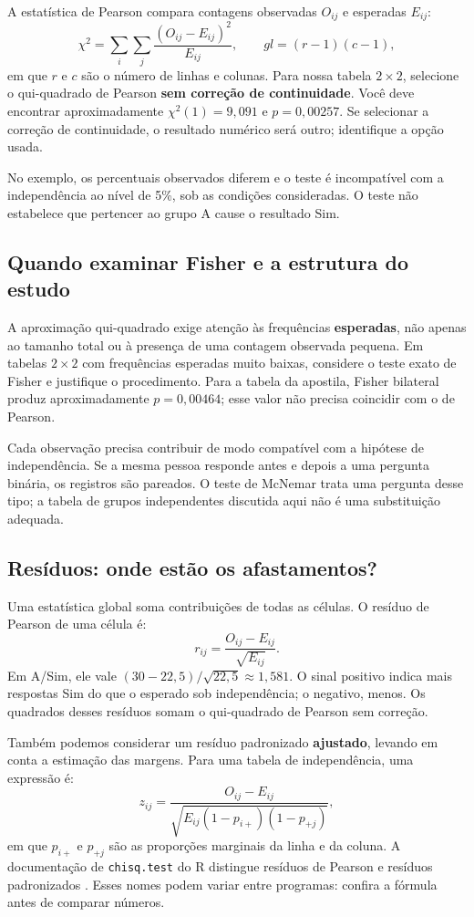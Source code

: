 A estatística de Pearson compara contagens observadas $O_{ij}$ e esperadas $E_{ij}$:
\[
\chi^2=\sum_i\sum_j\frac{(O_{ij}-E_{ij})^2}{E_{ij}},
\qquad gl=(r-1)(c-1),
\]
em que $r$ e $c$ são o número de linhas e colunas. Para nossa tabela $2\times2$, selecione o qui-quadrado de Pearson \textbf{sem correção de continuidade}. Você deve encontrar aproximadamente $\chi^2(1)=9{,}091$ e $p=0{,}00257$. Se selecionar a correção de continuidade, o resultado numérico será outro; identifique a opção usada.

No exemplo, os percentuais observados diferem e o teste é incompatível com a independência ao nível de 5\%, sob as condições consideradas. O teste não estabelece que pertencer ao grupo A cause o resultado Sim.

\subsection{Quando examinar Fisher e a estrutura do estudo}

A aproximação qui-quadrado exige atenção às frequências \textbf{esperadas}, não apenas ao tamanho total ou à presença de uma contagem observada pequena. Em tabelas $2\times2$ com frequências esperadas muito baixas, considere o teste exato de Fisher e justifique o procedimento. Para a tabela da apostila, Fisher bilateral produz aproximadamente $p=0{,}00464$; esse valor não precisa coincidir com o de Pearson.

Cada observação precisa contribuir de modo compatível com a hipótese de independência. Se a mesma pessoa responde antes e depois a uma pergunta binária, os registros são pareados. O teste de McNemar trata uma pergunta desse tipo; a tabela de grupos independentes discutida aqui não é uma substituição adequada.

\subsection{Resíduos: onde estão os afastamentos?}

Uma estatística global soma contribuições de todas as células. O resíduo de Pearson de uma célula é:
\[
r_{ij}=\frac{O_{ij}-E_{ij}}{\sqrt{E_{ij}}}.
\]
Em A/Sim, ele vale $(30-22{,}5)/\sqrt{22{,}5}\approx1{,}581$. O sinal positivo indica mais respostas Sim do que o esperado sob independência; o negativo, menos. Os quadrados desses resíduos somam o qui-quadrado de Pearson sem correção.

Também podemos considerar um resíduo padronizado \textbf{ajustado}, levando em conta a estimação das margens. Para uma tabela de independência, uma expressão é:
\[
z_{ij}=\frac{O_{ij}-E_{ij}}
{\sqrt{E_{ij}(1-p_{i+})(1-p_{+j})}},
\]
em que $p_{i+}$ e $p_{+j}$ são as proporções marginais da linha e da coluna. A documentação de \texttt{chisq.test} do R distingue resíduos de Pearson e resíduos padronizados \parencite{RQuiQuadrado}. Esses nomes podem variar entre programas: confira a fórmula antes de comparar números.


